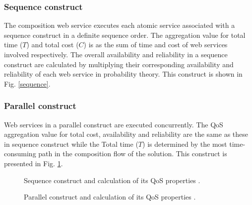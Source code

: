 \documentclass{IEEEtran}
\begin{document}
\subsubsection{Sequence construct}
The composition web service executes each atomic service associated with a sequence construct in a definite sequence order. The aggregation value for total time ($T$) and total cost ($C$) is as the sum of time and cost of web services involved respectively. The overall availability and reliability in a sequence construct are calculated by multiplying their corresponding availability and reliability of each web service in probability theory. This construct is shown in Fig. \ref{sequence}.
\subsubsection{Parallel construct}
Web services in a parallel construct are executed concurrently. The QoS aggregation value for total cost, availability and reliability are the same as these in sequence construct while the Total time ($T$) is determined by the most time-consuming path in the composition flow of the solution. This construct is presented in Fig. \ref{parallel}.

\begin{figure}[h]
\centerline{
}
\caption{Sequence construct and calculation of its QoS properties
\cite{yu2013adaptive}.}
\label{sequence}
\vspace{0.2cm}
\centerline{
}
\caption{Parallel construct and calculation of its QoS properties
\cite{yu2013adaptive}.}
\label{parallel}
\end{figure}
\end{document}
